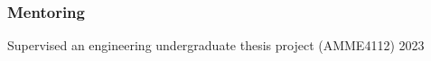 \documentclass[11pt]{article}       %
\begin{document}
\subsubsection*{Mentoring}
\vspace{-6pt}
Supervised an engineering undergraduate thesis project (AMME4112) \hfill 2023

\end{document}
